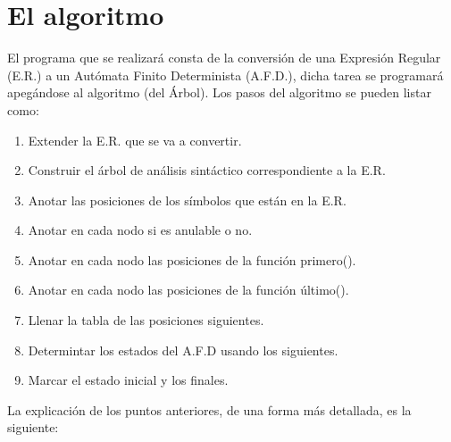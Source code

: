 \documentclass{report}
\begin{document}
\section{El algoritmo}
El programa que se realizará consta de la conversión de una Expresión Regular (E.R.) a un Autómata Finito Determinista (A.F.D.), dicha tarea se programará apegándose al algoritmo (del Árbol).
Los pasos del algoritmo se pueden listar como:
\begin{enumerate}
	\item Extender la E.R. que se va a convertir.
	\item Construir el árbol de análisis sintáctico correspondiente a la E.R.
	\item Anotar las posiciones de los símbolos que están en la E.R.
	\item Anotar en cada nodo si es anulable o no.
	\item Anotar en cada nodo las posiciones de la función primero().
	\item Anotar en cada nodo las posiciones de la función último().
	\item Llenar la tabla de las posiciones siguientes.
	\item Determintar los estados del A.F.D usando los siguientes.
	\item Marcar el estado inicial y los finales.
\end{enumerate}
La explicación de los puntos anteriores, de una forma más detallada, es la siguiente:
\end{document}
